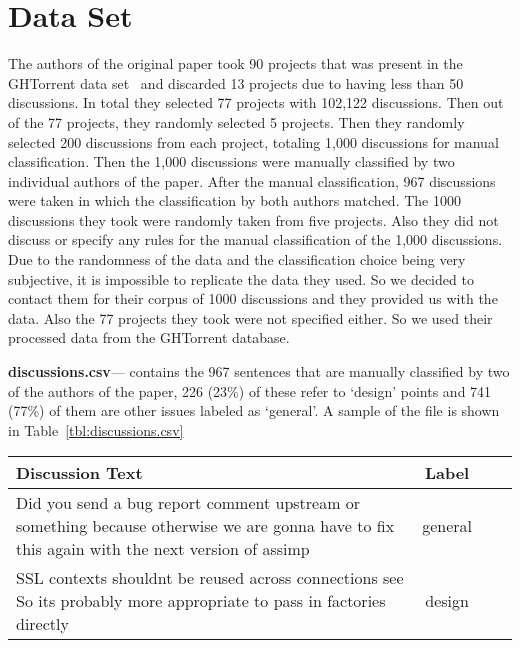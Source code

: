 \section{Data Set}
\label{sect:dataset}
The authors of the original paper took 90 projects that was present in the GHTorrent data set~\cite{Gousios2013} and discarded 13 projects due to having less than 50 discussions. In total they selected 77 projects with 102,122 discussions. Then out of the 77 projects, they randomly selected 5 projects. Then they randomly selected 200 discussions from each project, totaling 1,000 discussions for manual classification. Then the 1,000 discussions were manually classified by two individual authors of the paper. After the manual classification, 967 discussions were taken in which the classification by both authors matched. The 1000 discussions they took were randomly taken from five projects. Also they did not discuss or specify any rules for the manual classification of the 1,000 discussions. Due to the randomness of the data and the classification choice being very subjective, it is impossible to replicate the data they used. So we decided to contact them for their corpus of 1000 discussions and they provided us with the data. Also the 77 projects they took were not specified either. So we used their processed data from the GHTorrent database.

\noindent\textbf{discussions.csv}--- contains the 967 sentences that are manually classified by two of the authors of the paper, 226 (23\%) of these refer to `design' points and 741 (77\%) of them are other issues labeled as `general'. A sample of the file is shown in Table~\ref{tbl:discussions.csv}
\begin{table*}
	\centering
	\caption{Data sample in discussions.csv}
	\label{tbl:discussions.csv}
	\begin{tabular}{lccc} 
		\toprule
		\textbf{Discussion Text} & \textbf{Label}  \\
		\midrule
		Did you send a bug report comment upstream or something because otherwise we are gonna have to fix this again with the next version of assimp & general \\
		SSL contexts shouldnt be reused across connections see So its probably more appropriate to pass in factories directly & design \\
		\bottomrule
	\end{tabular}
\end{table*}

